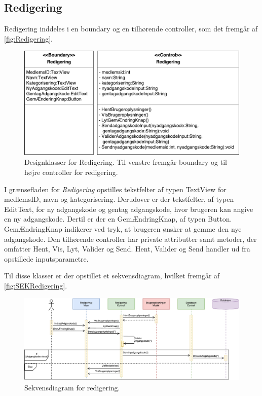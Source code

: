 \subsection*{Redigering}
Redigering inddeles i en boundary og en tilhørende controller, som det fremgår af \autoref{fig:Redigering}. 

\begin{figure} [H]
\centering
\includegraphics[width=1\textwidth]{figures/MVC/Redigering}
\caption{Designklasser for Redigering. Til venstre fremgår boundary og til højre controller for redigering.}
\label{fig:Redigering}
\end{figure}

\noindent
I grænsefladen for \textit{Redigering} opstilles tekstfelter af typen TextView for medlemsID, navn og kategorisering. Derudover er der tekstfelter, af typen EditText, for ny adgangskode og gentag adgangskode, hvor brugeren kan angive en ny adgangskode. Dertil er der en GemÆndringKnap, af typen Button. GemÆndringKnap indikerer ved tryk, at brugeren ønsker at gemme den nye adgangskode. 
Den tilhørende controller har private attributter samt metoder, der omfatter Hent, Vis, Lyt, Valider og Send. Hent, Valider og Send handler ud fra opstillede inputsparametre. 


Til disse klasser er der opstillet et sekvensdiagram, hvilket fremgår af \autoref{fig:SEKRedigering}.


\begin{figure} [H]
\centering
\includegraphics[width=1\textwidth]{figures/Sek/SEKRedigering}
\caption{Sekvensdiagram for redigering.}
\label{fig:SEKRedigering}
\end{figure}

